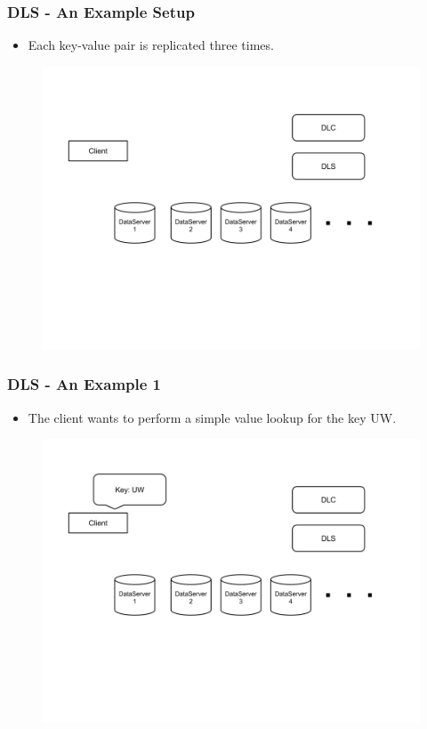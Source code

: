 \documentclass{beamer}
\begin{document}
\begin{frame}
  \frametitle{DLS - An Example Setup}
  \begin{itemize}
  \item Each key-value pair is replicated three times.
    \newline

  \end{itemize}
  \begin{figure}
    \begin{center}
      \centerline{\includegraphics[scale=0.40]{img/DLS_Example1.png}}
    \end{center}
  \end{figure}

\end{frame}


\begin{frame}
  \frametitle{DLS - An Example 1}
  \begin{itemize}
  \item The client wants to perform a simple value lookup for the key UW.
  \end{itemize}
  \begin{figure}
    \begin{center}
      \centerline{\includegraphics[scale=0.40]{img/DLS_Example2.png}}
    \end{center}
  \end{figure}
\end{frame}
\end{document}
